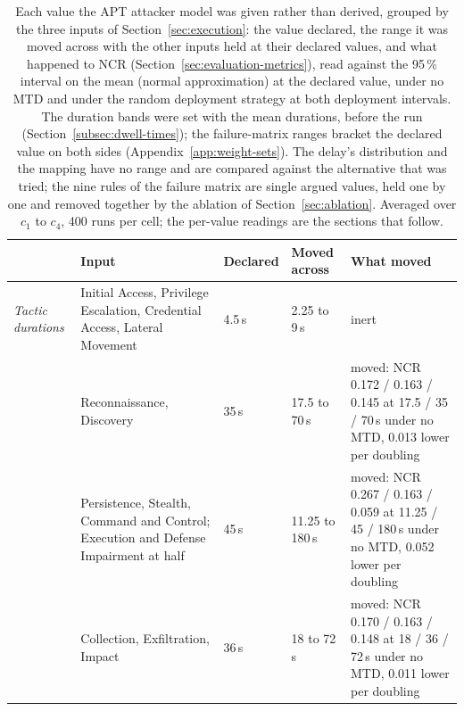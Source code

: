 
\begin{table}[htbp]
  \centering
  \caption[The declared values of the APT attacker model and the effect of moving each]{Each value the APT attacker model was given rather than derived, grouped by the three inputs of Section~\ref{sec:execution}: the value declared, the range it was moved across with the other inputs held at their declared values, and what happened to NCR (Section~\ref{sec:evaluation-metrics}), read against the 95\,\% interval on the mean (normal approximation) at the declared value, under no MTD and under the random deployment strategy at both deployment intervals. The duration bands were set with the mean durations, before the run (Section~\ref{subsec:dwell-times}); the failure-matrix ranges bracket the declared value on both sides (Appendix~\ref{app:weight-sets}). The delay's distribution and the mapping have no range and are compared against the alternative that was tried; the nine rules of the failure matrix are single argued values, held one by one and removed together by the ablation of Section~\ref{sec:ablation}. Averaged over $c_1$ to $c_4$, 400 runs per cell; the per-value readings are the sections that follow.}
  \label{tab:parameter-register}
  \tablestyle\setlength{\tabcolsep}{4pt}
  \begin{tabular}{@{}P{1.6cm}P{2.8cm}P{1.9cm}P{2.5cm}P{6.4cm}@{}}
    \toprule
    & Input & Declared & Moved across & What moved \\
    \midrule
    \emph{Tactic durations} & Initial Access, Privilege Escalation, Credential Access, Lateral Movement & 4.5\,s & 2.25 to 9\,s & inert \\
     & Reconnaissance, Discovery & 35\,s & 17.5 to 70\,s & moved: NCR 0.172 / 0.163 / 0.145 at 17.5 / 35 / 70\,s under no MTD, 0.013 lower per doubling \\
     & Persistence, Stealth, Command and Control; Execution and Defense Impairment at half & 45\,s & 11.25 to 180\,s & moved: NCR 0.267 / 0.163 / 0.059 at 11.25 / 45 / 180\,s under no MTD, 0.052 lower per doubling \\
     & Collection, Exfiltration, Impact & 36\,s & 18 to 72\,s & moved: NCR 0.170 / 0.163 / 0.148 at 18 / 36 / 72\,s under no MTD, 0.011 lower per doubling \\

\end{tabular}
\end{table}
